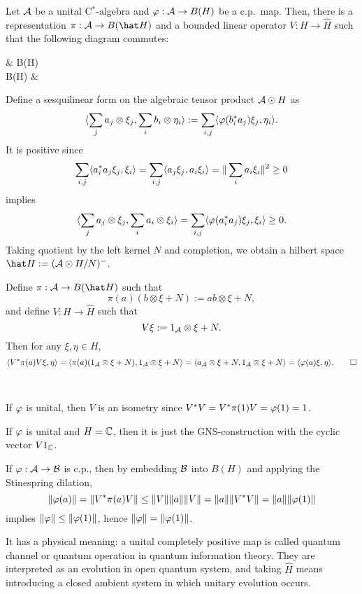 \documentclass{../../../small}
\begin{document}
\begin{thm}
Let $\mathcal{A}$ be a unital C$^*$-algebra and $\varphi:\mathcal{A}\to B(H)$ be a c.p.~map.
Then, there is a representation $\pi:\cA\to B(\hat H)$ and a bounded linear operator $V:H\to\hat H$ such that the following diagram commutes:
\begin{cd}
\cA {}  & B(H) \\
B(\hat H)  &
\end{cd}
\end{thm}
\begin{pf}
Define a sesquilinear form on the algebraic tensor product $\mathcal{A}\odot H$ as
\[\langle\sum_ja_j\otimes\xi_j,\sum_ib_i\otimes\eta_i\rangle:=\sum_{i,j}\langle\varphi(b_i^*a_j)\xi_j,\eta_i\rangle.\]
It is positive since
\[\sum_{i,j}\langle a_i^*a_j\xi_j,\xi_i\rangle=\sum_{i,j}\langle a_j\xi_j,a_i\xi_i\rangle=\|\sum_ia_i\xi_i\|^2\ge0\]
implies
\[\langle\sum_ja_j\otimes\xi_j,\sum_ia_i\otimes\xi_i\rangle=\sum_{i,j}\langle\varphi(a_i^*a_j)\xi_j,\xi_i\rangle\ge0.\]
Taking quotient by the left kernel $N$ and completion, we obtain a hilbert space $\hat H:=(\cA\odot H/N)^-$.

Define $\pi:\cA\to B(\hat H)$ such that
\[\pi(a)(b\otimes\xi+N):=ab\otimes\xi+N,\]
and define $V:H\to\hat H$ such that
\[V\xi:=1_{\mathcal{A}}\otimes\xi+N.\]
Then for any $\xi,\eta\in H$,
\[\langle V^*\pi(a)V\xi,\eta\rangle=\langle\pi(a)(1_{\mathcal{A}}\otimes\xi+N),1_{\mathcal{A}}\otimes\xi+N\rangle=\langle a_{\mathcal{A}}\otimes\xi+N,1_{\mathcal{A}}\otimes\xi+N\rangle=\langle\varphi(a)\xi,\eta\rangle.\qedhere\]
\end{pf}

\begin{rmk}\,
\begin{parts}
\item If $\varphi$ is unital, then $V$ is an isometry since $V^*V=V^*\pi(1)V=\varphi(1)=1$.
\item If $\varphi$ is unital and $H=\mathbb{C}$, then it is just the GNS-construction with the cyclic vector $V1_{\mathbb{C}}$.
\item If $\varphi:\mathcal{A}\to\mathcal{B}$ is c.p., then by embedding $\mathcal{B}$ into $B(H)$ and applying the Stinespring dilation,
\[\|\varphi(a)\|=\|V^*\pi(a)V\|\le\|V\|\|a\|\|V\|=\|a\|\|V^*V\|=\|a\|\|\varphi(1)\|\]
implies $\|\varphi\|\le\|\varphi(1)\|$, hence $\|\varphi\|=\|\varphi(1)\|$.
\item It has a physical meaning: a unital completely positive map is called quantum channel or quantum operation in quantum information theory. They are interpreted as an evolution in open quantum system, and taking $\hat H$ means introducing a closed ambient system in which unitary evolution occurs.
\end{parts}
\end{rmk}
\end{document}
